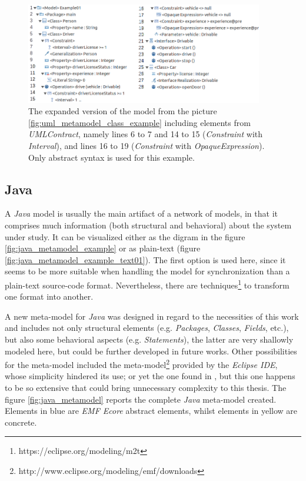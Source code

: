 \documentclass[tuberlin,cic,tc,english,noabntcite]{iiufrgs}
\begin{document}
\begin{figure}[h]
    \caption{The expanded version of the model from the picture \ref{fig:uml_metamodel_class_example} including elements from \emph{UMLContract}, namely lines 6 to 7 and 14 to 15 (\emph{Constraint} with \emph{Interval}), and lines 16 to 19 (\emph{Constraint} with \emph{OpaqueExpression}). Only abstract syntax is used for this example.}
    \begin{center}
        \includegraphics[width=28em]{umlContractDiagramExample01}
    \end{center}
    \label{fig:uml_metamodel_contracts_example}
\end{figure}

\subsection{Java}
A \emph{Java} model is usually the main artifact of a network of models, in that it comprises much information (both structural and behavioral) about the system under study. It can be visualized either as the digram in the figure \ref{fig:java_metamodel_example} or as plain-text (figure \ref{fig:java_metamodel_example_text01}). The first option is used here, since it seems to be more suitable when handling the model for synchronization than a plain-text source-code format. Nevertheless, there are techniques\footnote{https://eclipse.org/modeling/m2t} to transform one format into another.

A new meta-model for \emph{Java} was designed in regard to the necessities of this work and includes not only structural elements (e.g. \emph{Packages}, \emph{Classes}, \emph{Fields}, etc.), but also some behavioral aspects (e.g. \emph{Statements}), the latter are very shallowly modeled here, but could be further developed in future works. Other possibilities for the meta-model included the meta-model\footnote{http://www.eclipse.org/modeling/emf/downloads} provided by the \emph{Eclipse IDE}, whose simplicity hindered its use; or yet the one found in \citet{heidenreich2010closing}, but this one happens to be so extensive that could bring unnecessary complexity to this thesis. The figure \ref{fig:java_metamodel} reports the complete \emph{Java} meta-model created. Elements in blue are \emph{EMF Ecore} abstract elements, whilst elements in yellow are concrete.
\end{document}
